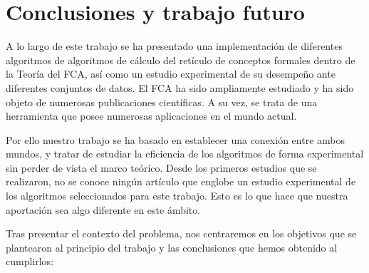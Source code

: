 \documentclass[oneside,openright,titlepage,numbers=noenddot,openany,headinclude,footinclude=true,
cleardoublepage=empty,abstractoff,BCOR=5mm,paper=a4,fontsize=12pt,main=spanish]{scrreprt}
\begin{document}
\chapter{Conclusiones y trabajo futuro}
   \label{chap:8}
A lo largo de este trabajo se ha presentado una implementación de diferentes algoritmos de algoritmos de cálculo del retículo de conceptos formales dentro de la Teoría del FCA, así como un estudio experimental de su desempeño ante diferentes conjuntos de datos. El FCA ha sido ampliamente estudiado y ha sido objeto de numerosas publicaciones científicas. A su vez, se trata de una herramienta que posee numerosas aplicaciones en el mundo actual. 

Por ello nuestro trabajo se ha basado en establecer una conexión entre ambos mundos, y tratar de estudiar la eficiencia de los algoritmos de forma experimental sin perder de vista el marco teórico. Desde los primeros estudios que se realizaron, no se conoce ningún artículo que englobe un estudio experimental de los algoritmos seleccionados para este trabajo. Esto es lo que hace que nuestra aportación sea algo diferente en este ámbito.

Tras presentar el contexto del problema, nos centraremos en los objetivos que se plantearon al principio del trabajo y las conclusiones que hemos obtenido al cumplirlos:
\end{document}
